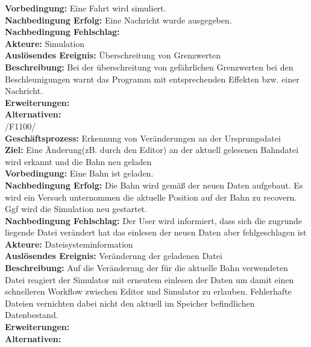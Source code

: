 \textbf{Vorbedingung:} Eine Fahrt wird simuliert.\\
\textbf{Nachbedingung Erfolg:} Eine Nachricht wurde ausgegeben.\\
\textbf{Nachbedingung Fehlschlag:} \\
\textbf{Akteure:} Simulation\\
\textbf{Auslösendes Ereignis:} Überschreitung von Grenzwerten\\
\textbf{Beschreibung:} Bei der überschreitung von gefährlichen Grenzwerten bei den Beschleunigungen warnt das Programm mit entsprechenden Effekten bzw. einer Nachricht.\\
\textbf{Erweiterungen:}\\
\textbf{Alternativen:}\\

/F1100/\\
\textbf{Geschäftsprozess:} Erkennung von Veränderungen an der Ursprungsdatei\\
\textbf{Ziel:} Eine Änderung(zB. durch den Editor) an der aktuell gelesenen Bahndatei wird erkannt und die Bahn neu geladen\\
\textbf{Vorbedingung:} Eine Bahn ist geladen.\\
\textbf{Nachbedingung Erfolg:} Die Bahn wird gemäß der neuen Daten aufgebaut. Es wird ein Versuch unternommen die aktuelle Position auf der Bahn zu recovern. Ggf wird die Simulation neu gestartet.\\
\textbf{Nachbedingung Fehlschlag:} Der User wird informiert, dass sich die zugrunde liegende Datei verändert hat das einlesen der neuen Daten aber fehlgeschlagen ist\\
\textbf{Akteure:} Dateisysteminformation\\
\textbf{Auslösendes Ereignis:} Veränderung der geladenen Datei\\
\textbf{Beschreibung:} Auf die Veränderung der für die aktuelle Bahn verwendeten Datei reagiert der Simulator mit erneutem einlesen der Daten um damit einen schnelleren Workflow zwischen Editor und Simulator zu erlauben. 
Fehlerhafte Dateien vernichten dabei nicht den aktuell im Speicher befindlichen Datenbestand.\\
\textbf{Erweiterungen:}\\
\textbf{Alternativen:}\\